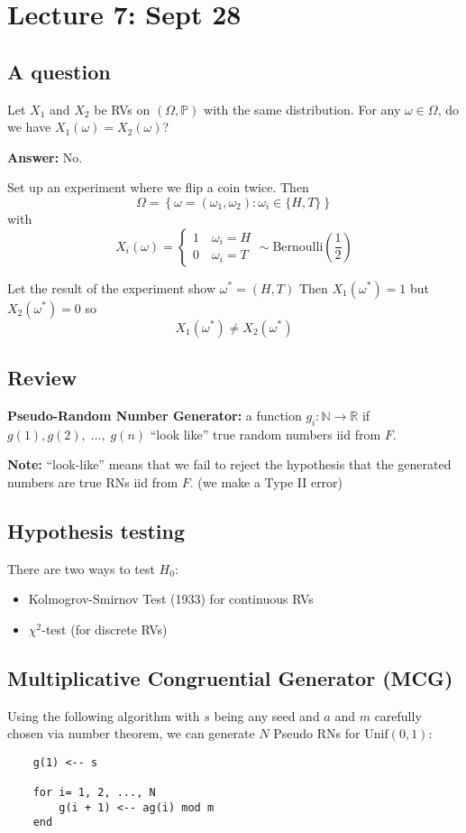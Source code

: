 \documentclass[12pt]{article}
\renewcommand{\P}{\mathbb{P}}
\newcommand{\R}{\mathbb{R}}
\newcommand{\ellipsis}{\; \dots, \;}
\begin{document}
\section*{Lecture 7: Sept 28}
\subsection*{A question}
Let $X_1$ and $X_2$ be RVs on $(\Omega, \P)$ with the same distribution. For any $\omega \in \Omega$, do we have $X_1(\omega) = X_2(\omega)$? 

\textbf{Answer:} No.

Set up an experiment where we flip a coin twice. Then 
\[\Omega = \left\{\omega = (\omega_1, \omega_2): \omega_i \in \{H, T\}\right\}\]
with 
\[X_i(\omega) = \begin{cases}
    1 \quad \omega_i = H\\
    0 \quad \omega_i = T
\end{cases} \sim \text{Bernoulli}\left(\frac{1}{2}\right)\]

Let the result of the experiment show $\omega^* = (H, T)$ Then $X_1(\omega^*) = 1$ but $X_2(\omega^*) = 0$ so 
\[X_1(\omega^*) \neq X_2(\omega^*)\]

\subsection*{Review}
\textbf{Pseudo-Random Number Generator:} a function $g_i: \mathbb{N} \to \R$ if $g(1), g(2), \ellipsis g(n)$ ``look like'' true random numbers iid from $F$. 

\textbf{Note:} ``look-like'' means that we fail to reject the hypothesis that the generated numbers are true RNs iid from $F$. (we make a Type II error)

\subsection*{Hypothesis testing}
There are two ways to test $H_0$:
\begin{itemize}
    \item Kolmogrov-Smirnov Test (1933) for continuous RVs
    \item $\chi^2$-test (for discrete RVs)
\end{itemize}

\subsection*{Multiplicative Congruential Generator (MCG)}
Using the following algorithm with $s$ being any seed and $a$ and $m$ carefully chosen via number theorem, we can generate $N$ Pseudo RNs for $\text{Unif}(0, 1)$:
\begin{verbatim}
    g(1) <-- s

    for i= 1, 2, ..., N
        g(i + 1) <-- ag(i) mod m
    end
\end{verbatim}
\end{document}
